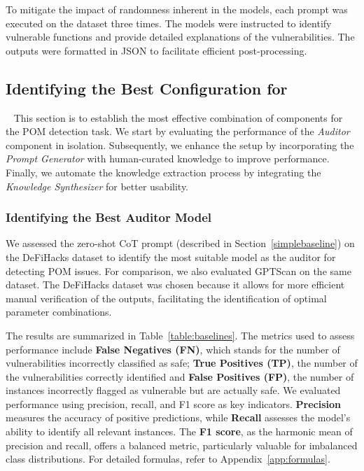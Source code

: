 To mitigate the impact of randomness inherent in the models, each prompt was executed on the dataset three times. The models were instructed to identify vulnerable functions and provide detailed explanations of the vulnerabilities. The outputs were formatted in JSON to facilitate efficient post-processing.


\subsection{Identifying the Best Configuration for \tool} ~\label{subsec:baselines}
This section is to establish the most effective combination of components for the POM detection task.
We start by evaluating the performance of the \textit{Auditor} component in isolation. 
Subsequently, we enhance the setup by incorporating the \textit{Prompt Generator} with human-curated knowledge to improve performance.
Finally, we automate the knowledge extraction process by integrating the \textit{Knowledge Synthesizer} for better usability.

\subsubsection{Identifying the Best Auditor Model}

We assessed the zero-shot CoT prompt (described in Section~\ref{simplebaseline}) on the DeFiHacks dataset to identify the most suitable model as the auditor for detecting POM issues. For comparison, we also evaluated GPTScan on the same dataset.
The DeFiHacks dataset was chosen because it allows for more efficient manual verification of the outputs, facilitating the identification of optimal parameter combinations. 

The results are summarized in Table~\ref{table:baselines}.  The metrics used to assess performance include \textbf{False Negatives (FN)}, which stands for the number of vulnerabilities incorrectly classified as safe; \textbf{True Positives (TP)}, the number of the vulnerabilities correctly identified and \textbf{False Positives (FP)}, the number of instances incorrectly flagged as vulnerable but are actually safe.
We evaluated performance using precision, recall, and F1 score as key indicators. \textbf{Precision} measures the accuracy of positive predictions, while \textbf{Recall} assesses the model's ability to identify all relevant instances.
The \textbf{F1 score}, as the harmonic mean of precision and recall, offers a balanced metric, particularly valuable for imbalanced class distributions. For detailed formulas, refer to Appendix~\ref{app:formulas}.

